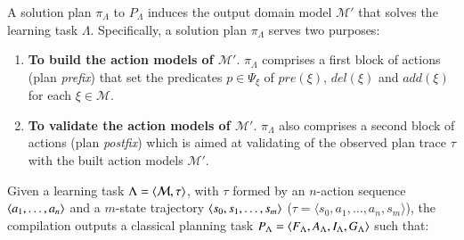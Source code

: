 \vspace{0.25cm}

A solution plan $\pi_\Lambda$ to $P_{\Lambda}$ induces the output domain model $\mathcal{M}'$ that solves the learning task $\Lambda$. Specifically, a solution plan $\pi_\Lambda$ serves two purposes:

\begin{enumerate}
\item {\bf To build the action models of $\mathcal{M}'$}. $\pi_\Lambda$ comprises a first block of actions (plan {\em prefix}) that set the predicates $p\in \Psi_{\xi}$ of $pre(\xi)$, $del(\xi)$ and $add(\xi)$ for each $\xi\in\mathcal{M}$.
\item {\bf To validate the action models of $\mathcal{M}'$}. $\pi_\Lambda$ also comprises a second block of actions (plan {\em postfix}) which is aimed at validating of the observed plan trace $\tau$ with the built action models $\mathcal{M}'$.
\end{enumerate}


Given a learning task $\Lambda={\langle \mathcal{M},\tau \rangle}$, with $\tau$ formed by an $n$-action sequence ${\langle a_1, \ldots, a_n \rangle}$ and a $m$-state trajectory ${\langle s_0, s_1, \ldots, s_m \rangle}$ ($\tau = \langle s_0, a_1, \ldots, a_n, s_m \rangle$), the compilation outputs a classical planning task $P_{\Lambda}={\langle F_{\Lambda},A_{\Lambda},I_{\Lambda},G_{\Lambda} \rangle}$ such that:


